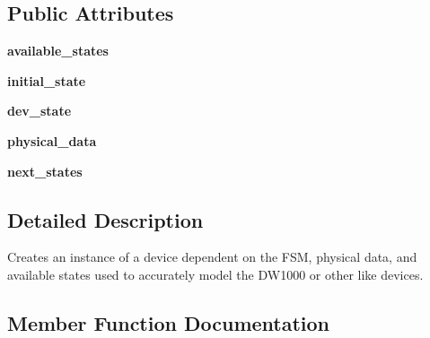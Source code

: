 \subsection*{Public Attributes}
\begin{DoxyCompactItemize}
\item 
\mbox{\label{classsimlib_1_1_f_s_m_1_1_device_af6a460115a317bf2705479cc12ebcb81}} 
{\bfseries available\+\_\+states}
\item 
\mbox{\label{classsimlib_1_1_f_s_m_1_1_device_aa931047c9f7d959f59e23e968e70d2c6}} 
{\bfseries initial\+\_\+state}
\item 
\mbox{\label{classsimlib_1_1_f_s_m_1_1_device_ac59c9ebe10d83f78f0840f5e1eb6d351}} 
{\bfseries dev\+\_\+state}
\item 
\mbox{\label{classsimlib_1_1_f_s_m_1_1_device_a3fc1af3d8a1500d7b27e4ad6a80dca59}} 
{\bfseries physical\+\_\+data}
\item 
\mbox{\label{classsimlib_1_1_f_s_m_1_1_device_a90f519879573a37f7200618a70b02218}} 
{\bfseries next\+\_\+states}
\end{DoxyCompactItemize}


\subsection{Detailed Description}
\begin{DoxyVerb}Creates an instance of a device dependent on the FSM,
physical data, and available states used to accurately
model the DW1000 or other like devices. 
\end{DoxyVerb}
 

\subsection{Member Function Documentation}
\mbox{\label{classsimlib_1_1_f_s_m_1_1_device_a66671fefc8ed8e04091244d40ae9eb41}} 
